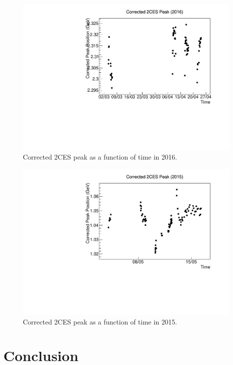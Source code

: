 \documentclass[11pt]{article}
\begin{document}
\begin{figure}[htbp] 
\begin{center}
\includegraphics[width =  .9\textwidth]{figures/twocorr2016.pdf}
\caption{Corrected 2CES peak as a function of time in 2016.} 
\label{fig:twocorr2016}
\end{center}
\end{figure}

\begin{figure}[htbp] 
\begin{center}
\includegraphics[width =  .9\textwidth]{figures/twocorr2015.pdf}
\caption{Corrected 2CES peak as a function of time in 2015.} 
\label{fig:twocorr2015}
\end{center}
\end{figure}
\FloatBarrier
\section{Conclusion}
\end{document}
